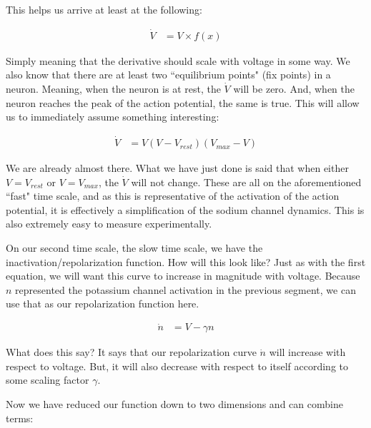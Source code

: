 This helps us arrive at least at the following: 

\begin{equation} \label{fn1}
\begin{split}
\dot{V} &= V \times f(x)
\end{split}
\end{equation}


Simply meaning that the derivative should scale with voltage in some way. We also know that there are at least two ``equilibrium points" (fix points) in a neuron. Meaning, when the neuron is at rest, the $\dot{V}$ will be zero. And, when the neuron reaches the peak of the action potential, the same is true. This will allow us to immediately assume something interesting:

\begin{equation} \label{fn2}
\begin{split}
\dot{V} &= V(V - V_{rest})(V_{max} - V)
\end{split}
\end{equation}

We are already almost there. What we have just done is said that when either $V = V_{rest}$ or $V = V_{max}$, the $\dot{V}$ will not change. These are all on the aforementioned ``fast" time scale, and as this is representative of the activation of the action potential, it is effectively a simplification of the sodium channel dynamics. This is also extremely easy to measure experimentally.\newline

On our second time scale, the slow time scale, we have the inactivation/repolarization function. How will this look like? Just as with the first equation, we will want this curve to increase in magnitude with voltage. Because $n$ represented the potassium channel activation in the previous segment, we can use that as our repolarization function here. 

\begin{equation} \label{fn3}
\begin{split}
\dot{n} &= V - \gamma n
\end{split}
\end{equation}

What does this say? It says that our repolarization curve $\dot{n}$ will increase with respect to voltage. But, it will also decrease with respect to itself according to some scaling factor $\gamma$.\newline

Now we have reduced our function down to two dimensions and can combine terms: 
    
